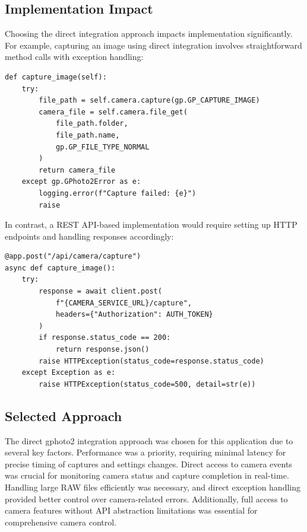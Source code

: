 \subsection{Implementation Impact}

Choosing the direct integration approach impacts implementation significantly. For example, capturing an image using direct integration involves straightforward method calls with exception handling:

\begin{verbatim}
def capture_image(self):
    try:
        file_path = self.camera.capture(gp.GP_CAPTURE_IMAGE)
        camera_file = self.camera.file_get(
            file_path.folder,
            file_path.name,
            gp.GP_FILE_TYPE_NORMAL
        )
        return camera_file
    except gp.GPhoto2Error as e:
        logging.error(f"Capture failed: {e}")
        raise
\end{verbatim}

In contrast, a REST API-based implementation would require setting up HTTP endpoints and handling responses accordingly:

\begin{verbatim}
@app.post("/api/camera/capture")
async def capture_image():
    try:
        response = await client.post(
            f"{CAMERA_SERVICE_URL}/capture",
            headers={"Authorization": AUTH_TOKEN}
        )
        if response.status_code == 200:
            return response.json()
        raise HTTPException(status_code=response.status_code)
    except Exception as e:
        raise HTTPException(status_code=500, detail=str(e))
\end{verbatim}

\subsection{Selected Approach}

The direct gphoto2 integration approach was chosen for this application due to several key factors. Performance was a priority, requiring minimal latency for precise timing of captures and settings changes. Direct access to camera events was crucial for monitoring camera status and capture completion in real-time. Handling large RAW files efficiently was necessary, and direct exception handling provided better control over camera-related errors. Additionally, full access to camera features without API abstraction limitations was essential for comprehensive camera control.

